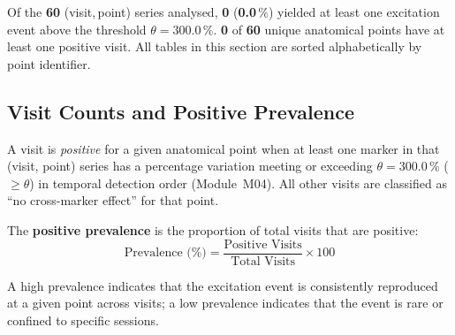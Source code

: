 \documentclass[a4paper,11pt]{article}
\begin{document}
\noindent
Of the \textbf{60} (visit,\,point) series analysed,
\textbf{0} (\textbf{0.0}\,\%) yielded at least one
excitation event above the threshold $\theta = 300.0\,\%$.
\textbf{0} of \textbf{60} unique anatomical points
have at least one positive visit.
All tables in this section are sorted alphabetically by point identifier.

\subsection{Visit Counts and Positive Prevalence}

A visit is \emph{positive} for a given anatomical point when at least one marker in that
(visit, point) series has a percentage variation meeting or exceeding
$\theta = 300.0\,\%$ ($\geq \theta$) in temporal detection order (Module~M04).
All other visits are classified as ``no cross-marker effect'' for that point.

The \textbf{positive prevalence} is the proportion of total visits that are positive:
\[
  \text{Prevalence (\%)} = \frac{\text{Positive Visits}}{\text{Total Visits}} \times 100
\]

A high prevalence indicates that the excitation event is consistently reproduced at a given
point across visits; a low prevalence indicates that the event is rare or confined to
specific sessions.
\end{document}
